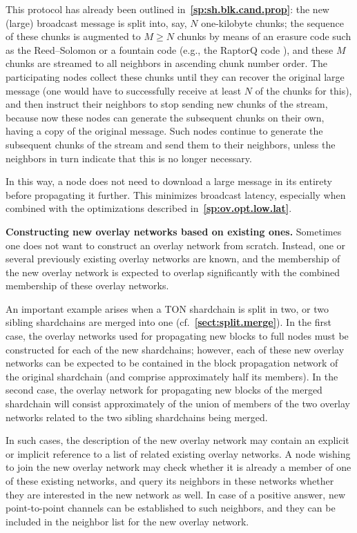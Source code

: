 \documentclass[12pt,oneside]{article}
\def\makepoint#1{\medbreak\noindent{\bf #1.\ }}
\def\nxsubpoint{\refstepcounter{subsubsection}%
  \smallbreak\makepoint{\thesubsubsection}}
\def\refpoint#1{{\rm\textbf{\ref{#1}}}}
\let\ptref=\refpoint
\def\embt(#1.){\textbf{#1.}}
\begin{document}
This protocol has already been outlined
in~\ptref{sp:sh.blk.cand.prop}: the new (large) broadcast message is
split into, say, $N$ one-kilobyte chunks; the sequence of these chunks
is augmented to $M\geq N$ chunks by means of an erasure code such as
the Reed--Solomon or a fountain code (e.g., the RaptorQ code
\cite{RaptorQ} \cite{Raptor}), and these $M$ chunks are streamed to
all neighbors in ascending chunk number order. The participating nodes
collect these chunks until they can recover the original large message
(one would have to successfully receive at least $N$ of the chunks for
this), and then instruct their neighbors to stop sending new chunks of
the stream, because now these nodes can generate the subsequent chunks
on their own, having a copy of the original message. Such nodes
continue to generate the subsequent chunks of the stream and send them
to their neighbors, unless the neighbors in turn indicate that this is
no longer necessary.

In this way, a node does not need to download a large message in its
entirety before propagating it further. This minimizes broadcast
latency, especially when combined with the optimizations described
in~\ptref{sp:ov.opt.low.lat}.

\nxsubpoint \embt(Constructing new overlay networks based on existing
ones.)  Sometimes one does not want to construct an overlay network
from scratch. Instead, one or several previously existing overlay
networks are known, and the membership of the new overlay network is
expected to overlap significantly with the combined membership of
these overlay networks.

An important example arises when a TON shardchain is split in two, or
two sibling shardchains are merged into one
(cf.~\ptref{sect:split.merge}). In the first case, the overlay
networks used for propagating new blocks to full nodes must be
constructed for each of the new shardchains; however, each of these
new overlay networks can be expected to be contained in the block
propagation network of the original shardchain (and comprise
approximately half its members). In the second case, the overlay
network for propagating new blocks of the merged shardchain will
consist approximately of the union of members of the two overlay
networks related to the two sibling shardchains being merged.

In such cases, the description of the new overlay network may contain
an explicit or implicit reference to a list of related existing
overlay networks. A node wishing to join the new overlay network may
check whether it is already a member of one of these existing
networks, and query its neighbors in these networks whether they are
interested in the new network as well. In case of a positive answer,
new point-to-point channels can be established to such neighbors, and
they can be included in the neighbor list for the new overlay network.
\end{document}
